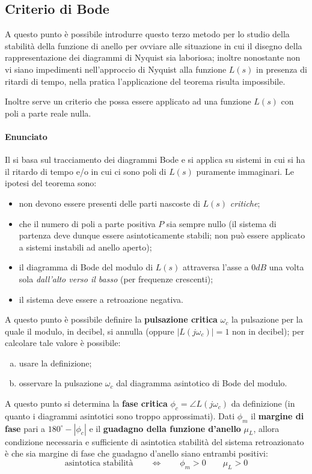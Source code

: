 	\subsection{Criterio di Bode}
		A questo punto è possibile introdurre questo terzo metodo per lo studio della stabilità della funzione di anello per ovviare alle situazione in cui il disegno della rappresentazione dei diagrammi di Nyquist sia laboriosa; inoltre nonostante non vi siano impedimenti nell'approccio di Nyquist alla funzione $L(s)$ in presenza di ritardi di tempo, nella pratica l'applicazione del teorema risulta impossibile.
	
		Inoltre serve un criterio che possa essere applicato ad una funzione $L(s)$ con poli a parte reale nulla.
		
		\paragraph{Enunciato} Il  si basa sul tracciamento dei diagrammi Bode e si applica su sistemi in cui si ha il ritardo di tempo e/o in cui ci sono poli di $L(s)$ puramente immaginari. Le ipotesi del teorema sono:
		\begin{itemize}
			\item non devono essere presenti delle parti nascoste di $L(s)$ \textit{critiche};
			\item che il numero di poli a parte positiva $P$ sia sempre nullo (il sistema di partenza deve dunque essere asintoticamente stabili; non può essere applicato a sistemi instabili ad anello aperto);
			\item il diagramma di Bode del modulo di $L(s)$ attraversa l'asse a $0dB$ una volta sola \textit{dall'alto verso il basso} (per frequenze crescenti);
			\item il sistema deve essere a retroazione negativa.
		\end{itemize}
		A questo punto è possibile definire la \textbf{pulsazione critica} $\omega_c$ la pulsazione per la quale il modulo, in decibel, si annulla (oppure $|L(j\omega_c)| = 1$ non in decibel); per calcolare tale valore è possibile:
		\begin{enumerate}[a)]
			\item usare la definizione; 
			\item osservare la pulsazione $\omega_c$ dal diagramma asintotico di Bode del modulo.
		\end{enumerate}
		A questo punto si determina la \textbf{fase critica} $\phi_c = \angle L(j\omega_c)$ da definizione (in quanto i diagrammi asintotici sono troppo approssimati). Dati $\phi_m$ il \textbf{margine di fase} pari a $180^\circ - |\phi_c|$ e il \textbf{guadagno della funzione d'anello} $\mu_L$, allora condizione necessaria e sufficiente di asintotica stabilità del sistema retroazionato è che sia margine di fase che guadagno d'anello siano entrambi positivi:
		\[ \textrm{asintotica stabilità} \qquad \Leftrightarrow \qquad \phi_m > 0 \qquad \mu_L> 0\]
		
